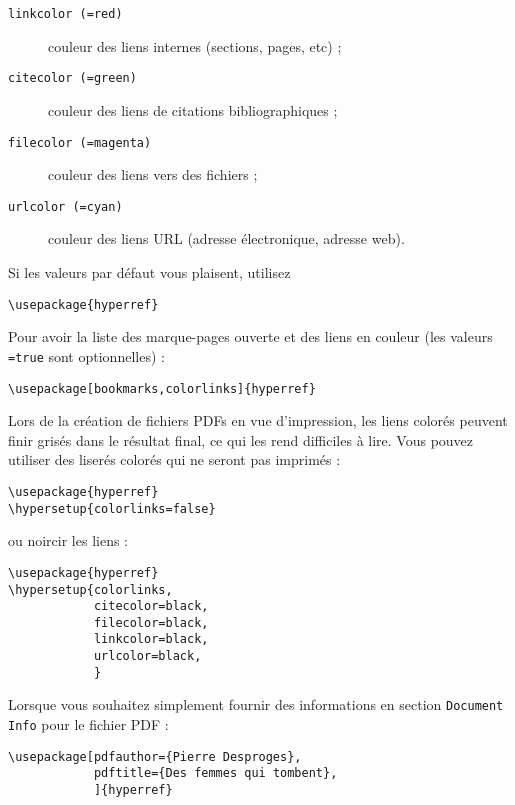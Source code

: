 \begin{flushleft}
\begin{description}
\begin{description}
    \item [\texttt{linkcolor (=red)}] couleur des liens
      internes (sections, pages, etc) ;
    \item [\texttt{citecolor (=green)}] couleur des
      liens de citations bibliographiques ;
    \item [\texttt{filecolor (=magenta)}] couleur des
      liens vers des fichiers ;
    \item [\texttt{urlcolor (=cyan)}] couleur des liens
      URL (adresse électronique, adresse web).
    \end{description}
\end{description}
\end{flushleft}

Si les valeurs par défaut vous plaisent, utilisez
\begin{code}
\begin{verbatim}
\usepackage{hyperref}
\end{verbatim}
\end{code}

Pour avoir la liste des marque-pages ouverte et des liens en couleur
(les valeurs \texttt{=true} sont optionnelles) :
\begin{code}
\begin{verbatim}
\usepackage[bookmarks,colorlinks]{hyperref}
\end{verbatim}
\end{code}

Lors de la création de fichiers PDFs en vue d'impression, les liens
colorés peuvent finir grisés dans le résultat final, ce qui les rend
difficiles à lire. Vous pouvez utiliser des liserés colorés qui ne
seront pas imprimés :
\begin{code}
\begin{verbatim}
\usepackage{hyperref}
\hypersetup{colorlinks=false}
\end{verbatim}
\end{code}
\noindent ou noircir les liens :
\begin{code}
\begin{verbatim}
\usepackage{hyperref}
\hypersetup{colorlinks,
            citecolor=black,
            filecolor=black,
            linkcolor=black,
            urlcolor=black,
            }
\end{verbatim}
\end{code}

Lorsque vous souhaitez simplement fournir des informations en section
\texttt{Document Info} pour le fichier PDF :
\begin{code}
\begin{verbatim}
\usepackage[pdfauthor={Pierre Desproges},
            pdftitle={Des femmes qui tombent},
            ]{hyperref}
\end{verbatim}
\end{code}

